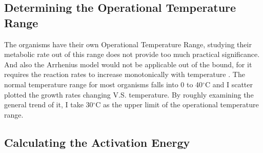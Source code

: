 \documentclass[a4paper]{article}
\begin{document}

\subsection{Determining the Operational Temperature Range}
The organisms have their own Operational Temperature Range, studying their metabolic rate out of this range does not provide too much practical significance. And also the Arrhenius model would not be applicable out of the bound, for it requires the reaction rates to increase monotonically with temperature \citep{peleg2012arrhenius}. The normal temperature range for most organisms falls into 0 to 40$^\circ$C \citep{thompson1942growth} and I scatter plotted the growth rates changing V.S. temperature. By roughly examining the general trend of it, I take 30$^\circ$C as the upper limit of the operational temperature range.\\



\subsection{Calculating the Activation Energy}
\end{document}
